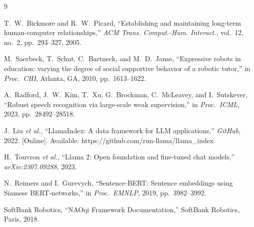 \documentclass[a4paper]{article}
\begin{document}
\begin{thebibliography}{9}

  T.~W.~Bickmore and R.~W.~Picard,
  ``Establishing and maintaining long-term human-computer relationships,''
  \textit{ACM Trans. Comput.-Hum. Interact.}, vol.~12, no.~2,
  pp.~293--327, 2005.

  M.~Saerbeck, T.~Schut, C.~Bartneck, and M.~D.~Janse,
  ``Expressive robots in education: varying the degree of social supportive behavior of a robotic tutor,''
  in \textit{Proc.\ CHI}, Atlanta, GA, 2010, pp.~1613--1622.

  A.~Radford, J.~W.~Kim, T.~Xu, G.~Brockman, C.~McLeavey, and I.~Sutskever,
  ``Robust speech recognition via large-scale weak supervision,''
  in \textit{Proc.\ ICML}, 2023, pp.~28492--28518.

  J.~Liu \textit{et al.},
  ``LlamaIndex: A data framework for LLM applications,''
  \textit{GitHub}, 2022. [Online]. Available: https://github.com/run-llama/llama\_index

  H.~Touvron \textit{et al.},
  ``Llama 2: Open foundation and fine-tuned chat models,''
  \textit{arXiv:2307.09288}, 2023.

  N.~Reimers and I.~Gurevych,
  ``Sentence-BERT: Sentence embeddings using Siamese BERT-networks,''
  in \textit{Proc.\ EMNLP}, 2019, pp.~3982--3992.

  SoftBank Robotics,
  ``NAOqi Framework Documentation,''
  SoftBank Robotics, Paris, 2018.

\end{thebibliography}
\end{document}
